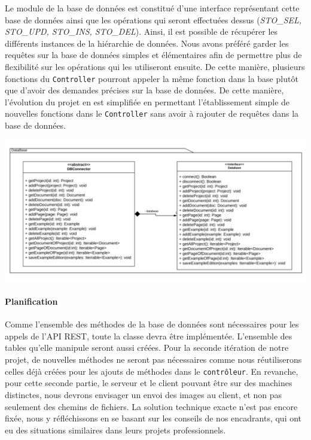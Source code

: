 Le module de la base de données est constitué d'une interface représentant cette base de données ainsi que les opérations qui seront effectuées dessus (\textit{STO\_SEL, STO\_UPD, STO\_INS, STO\_DEL}). Ainsi, il est possible de récupérer les différents instances de la hiérarchie de données. Nous avons préféré garder les requêtes sur la base de données simples et élémentaires afin de permettre plus de flexibilité sur les opérations qui les utiliseront ensuite. De cette manière, plusieurs fonctions du \texttt{Controller} pourront appeler la même fonction dans la base plutôt que d'avoir des demandes précises sur la base de données. De cette manière, l'évolution du projet en est simplifiée en permettant l'établissement simple de nouvelles fonctions dans le \texttt{Controller} sans avoir à rajouter de requêtes dans la base de données.

\newpage
\begin{mdframed}[frametitle={Figure 11 : Architecture de la base de données}, innerbottommargin=10]
\begin{center}
\includegraphics[scale=0.5]{assets/UML_Database.pdf}
\end{center}
\end{mdframed}

\paragraph{Planification}
Comme l'ensemble des méthodes de la base de données sont nécessaires pour les appels de l'API REST, toute la classe devra être implémentée. L'ensemble des tables qu'elle manipule seront aussi créées. Pour la seconde itération de notre projet, de nouvelles méthodes ne seront pas nécessaires comme nous réutiliserons celles déjà créées pour les ajouts de méthodes dans le \texttt{contrôleur}. En revanche, pour cette seconde partie, le serveur et le client pouvant être sur des machines distinctes, nous devrons envisager un envoi des images au client, et non pas seulement des chemins de fichiers. La solution technique exacte n'est pas encore fixée, nous y réfléchissons en se basant sur les conseils de nos encadrants, qui ont eu des situations similaires dans leurs projets professionnels.

